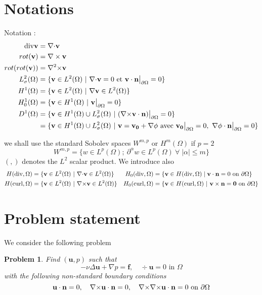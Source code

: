 \documentclass{article}
\newtheorem{problem}{Problem}
\newcommand{\ST}{\ensuremath{\; | \;}\xspace}
\newcommand{\Wmp}[2][2]{\ensuremath{W^{{#2},{#1}}}\xspace}
\newcommand{\Hdiv}{\ensuremath{H(\mathrm{div},\Omega)}\xspace}
\newcommand{\Hdivo}{\ensuremath{H_0(\mathrm{div},\Omega)}\xspace}
\newcommand{\Hcurl}{\ensuremath{H(\mathrm{curl},\Omega)}\xspace}
\newcommand{\Hcurlo}{\ensuremath{H_0(\mathrm{curl},\Omega)}\xspace}
\newcommand{\Hp}[1][1]{\ensuremath{H^{#1}(\Omega)}\xspace}
\newcommand{\Hpo}[1][1]{\ensuremath{H_0^{#1}(\Omega)}\xspace}
\begin{document}
\section{Notations}
Notation :
\begin{align*}
\mathrm{div} \mathbf{v} &= \div \mathbf{v} \\
rot(\mathbf{v})&=\nabla \times \mathbf{v}\\
rot(rot(\mathbf{v}))&=\rott \mathbf{v}\\
L^2_\sigma(\Omega) &= \{\mathbf{v} \in L^2(\Omega)\ |\ \div \mathbf{v} = 0\text{ et }\mathbf{v}\cdot \mathbf{n}\restr = 0 \}\\
\Hp &= \{\mathbf{v} \in L^2(\Omega)\ |\ \grad \mathbf{v}\in L^2(\Omega)\}\\
\Hpo &= \{\mathbf{v} \in \Hp\ |\ \mathbf{v}\restr = 0\}\\
D^1(\Omega) &= \{\mathbf{v} \in \Hp\cup L^2_\sigma(\Omega)\ |\ (\rot \mathbf{v}\cdot \mathbf{n})\restr = 0  \}\\
&=\{\mathbf{v} \in \Hp\cup L^2_\sigma(\Omega)\ |\ \mathbf{v}=\mathbf{v_0}+\grad\phi \text{ avec } \mathbf{v_0}\restr = 0,\ \grad\phi\cdot \mathbf{n}\restr = 0 \}
\end{align*}

we shall use the standard Sobolev spaces \Wmp[p]{m} or \Hp[m] if $p=2$
\begin{equation*}
  \Wmp[p]{m} = \{ w \in L^p(\Omega);\ \partial^\alpha w \in L^p(\Omega)\ \forall\;
  |\alpha| \leq m \}
\end{equation*}
$(,)$ denotes the $L^2$ scalar product.
We introduce also
\begin{align*}
  \Hdiv &= \{\mathbf{v} \in L^2(\Omega)\ |\ \div\mathbf{v} \in L^2(\Omega) \}  & \Hdivo & = \{ \mathbf{v} \in \Hdiv \ST \mathbf{v} \cdot \mathbf{n} = 0  \mbox{ on } \partial \Omega \} \\
  \Hcurl &= \{\mathbf{v} \in L^2(\Omega)\ |\ \rot\mathbf{v} \in L^2(\Omega) \}
  & \Hcurlo &= \{\mathbf{v} \in \Hcurl\ |\ \mathbf{v} \times \mathbf{n} =
  \mathbf{0} \mbox{ on } \partial \Omega \}
\end{align*}

\section{Problem statement}
\label{sec:problem-statement}

We consider the following problem
\begin{problem}
  \label{prob:1}
  Find $(\mathbf{u},p)$ such that
  \begin{equation}
    \label{eq:1}
    -\nu \Delta \textbf{u}  + \nabla p = \textbf{f}, \quad    \div \mathbf{u} =
    0 \mbox{ in } \Omega
  \end{equation}
  with the following non-standard boundary conditions
  \begin{equation}
    \label{eq:2}
    \mathbf{u} \cdot \mathbf{n} = 0,\quad {\nabla\times} \mathbf{u} \cdot \mathbf{n} = 0,
    \quad {\nabla\times} {\nabla\times} \mathbf{u} \cdot \mathbf{n} = 0 \mbox{ on } \partial \Omega
  \end{equation}
\end{problem}
\end{document}
